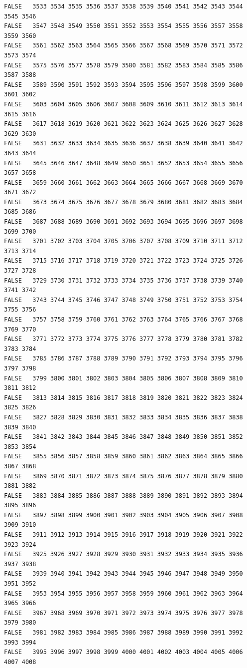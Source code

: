 \documentclass[]{article}
\begin{document}
\begin{verbatim}
FALSE   3533 3534 3535 3536 3537 3538 3539 3540 3541 3542 3543 3544 3545 3546
FALSE   3547 3548 3549 3550 3551 3552 3553 3554 3555 3556 3557 3558 3559 3560
FALSE   3561 3562 3563 3564 3565 3566 3567 3568 3569 3570 3571 3572 3573 3574
FALSE   3575 3576 3577 3578 3579 3580 3581 3582 3583 3584 3585 3586 3587 3588
FALSE   3589 3590 3591 3592 3593 3594 3595 3596 3597 3598 3599 3600 3601 3602
FALSE   3603 3604 3605 3606 3607 3608 3609 3610 3611 3612 3613 3614 3615 3616
FALSE   3617 3618 3619 3620 3621 3622 3623 3624 3625 3626 3627 3628 3629 3630
FALSE   3631 3632 3633 3634 3635 3636 3637 3638 3639 3640 3641 3642 3643 3644
FALSE   3645 3646 3647 3648 3649 3650 3651 3652 3653 3654 3655 3656 3657 3658
FALSE   3659 3660 3661 3662 3663 3664 3665 3666 3667 3668 3669 3670 3671 3672
FALSE   3673 3674 3675 3676 3677 3678 3679 3680 3681 3682 3683 3684 3685 3686
FALSE   3687 3688 3689 3690 3691 3692 3693 3694 3695 3696 3697 3698 3699 3700
FALSE   3701 3702 3703 3704 3705 3706 3707 3708 3709 3710 3711 3712 3713 3714
FALSE   3715 3716 3717 3718 3719 3720 3721 3722 3723 3724 3725 3726 3727 3728
FALSE   3729 3730 3731 3732 3733 3734 3735 3736 3737 3738 3739 3740 3741 3742
FALSE   3743 3744 3745 3746 3747 3748 3749 3750 3751 3752 3753 3754 3755 3756
FALSE   3757 3758 3759 3760 3761 3762 3763 3764 3765 3766 3767 3768 3769 3770
FALSE   3771 3772 3773 3774 3775 3776 3777 3778 3779 3780 3781 3782 3783 3784
FALSE   3785 3786 3787 3788 3789 3790 3791 3792 3793 3794 3795 3796 3797 3798
FALSE   3799 3800 3801 3802 3803 3804 3805 3806 3807 3808 3809 3810 3811 3812
FALSE   3813 3814 3815 3816 3817 3818 3819 3820 3821 3822 3823 3824 3825 3826
FALSE   3827 3828 3829 3830 3831 3832 3833 3834 3835 3836 3837 3838 3839 3840
FALSE   3841 3842 3843 3844 3845 3846 3847 3848 3849 3850 3851 3852 3853 3854
FALSE   3855 3856 3857 3858 3859 3860 3861 3862 3863 3864 3865 3866 3867 3868
FALSE   3869 3870 3871 3872 3873 3874 3875 3876 3877 3878 3879 3880 3881 3882
FALSE   3883 3884 3885 3886 3887 3888 3889 3890 3891 3892 3893 3894 3895 3896
FALSE   3897 3898 3899 3900 3901 3902 3903 3904 3905 3906 3907 3908 3909 3910
FALSE   3911 3912 3913 3914 3915 3916 3917 3918 3919 3920 3921 3922 3923 3924
FALSE   3925 3926 3927 3928 3929 3930 3931 3932 3933 3934 3935 3936 3937 3938
FALSE   3939 3940 3941 3942 3943 3944 3945 3946 3947 3948 3949 3950 3951 3952
FALSE   3953 3954 3955 3956 3957 3958 3959 3960 3961 3962 3963 3964 3965 3966
FALSE   3967 3968 3969 3970 3971 3972 3973 3974 3975 3976 3977 3978 3979 3980
FALSE   3981 3982 3983 3984 3985 3986 3987 3988 3989 3990 3991 3992 3993 3994
FALSE   3995 3996 3997 3998 3999 4000 4001 4002 4003 4004 4005 4006 4007 4008

\end{verbatim}
\end{document}
